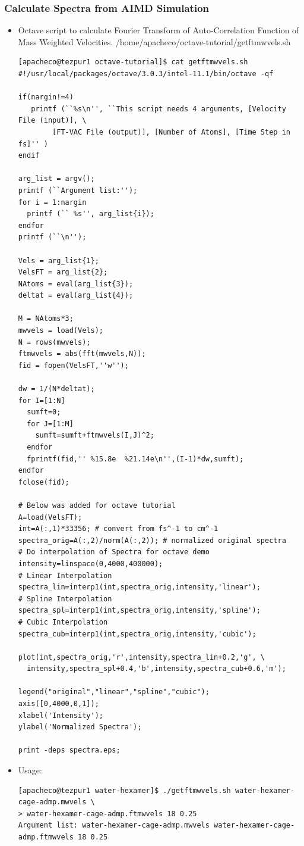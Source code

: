 \documentclass[slidestop,mathserif,compress,xcolor=svgnames]{beamer}
\begin{document}
\begin{frame}
  \frametitle{\small Calculate Spectra from AIMD Simulation}
  \begin{itemize}
    \item Octave script to calculate Fourier Transform of Auto-Correlation Function of Mass Weighted Velocities. /home/apacheco/octave-tutorial/getftmwvels.sh
  {\tiny
    \begin{verbatim}
[apacheco@tezpur1 octave-tutorial]$ cat getftmwvels.sh
#!/usr/local/packages/octave/3.0.3/intel-11.1/bin/octave -qf

if(nargin!=4)
   printf (``%s\n'', ``This script needs 4 arguments, [Velocity File (input)], \
        [FT-VAC File (output)], [Number of Atoms], [Time Step in fs]'' )
endif

arg_list = argv();
printf (``Argument list:'');
for i = 1:nargin
  printf (`` %s'', arg_list{i});
endfor
printf (``\n'');

Vels = arg_list{1};
VelsFT = arg_list{2};
NAtoms = eval(arg_list{3});
deltat = eval(arg_list{4});

M = NAtoms*3;
mwvels = load(Vels);
N = rows(mwvels);
ftmwvels = abs(fft(mwvels,N));
fid = fopen(VelsFT,''w'');

dw = 1/(N*deltat);
for I=[1:N]
  sumft=0;
  for J=[1:M]
    sumft=sumft+ftmwvels(I,J)^2;
  endfor
  fprintf(fid,'' %15.8e  %21.14e\n'',(I-1)*dw,sumft);
endfor
fclose(fid);

# Below was added for octave tutorial
A=load(VelsFT);
int=A(:,1)*33356; # convert from fs^-1 to cm^-1
spectra_orig=A(:,2)/norm(A(:,2)); # normalized original spectra
# Do interpolation of Spectra for octave demo
intensity=linspace(0,4000,400000);
# Linear Interpolation
spectra_lin=interp1(int,spectra_orig,intensity,'linear');
# Spline Interpolation
spectra_spl=interp1(int,spectra_orig,intensity,'spline');
# Cubic Interpolation
spectra_cub=interp1(int,spectra_orig,intensity,'cubic');

plot(int,spectra_orig,'r',intensity,spectra_lin+0.2,'g', \
  intensity,spectra_spl+0.4,'b',intensity,spectra_cub+0.6,'m');

legend("original","linear","spline","cubic");
axis([0,4000,0,1]);
xlabel('Intensity');
ylabel('Normalized Spectra');

print -deps spectra.eps;
    \end{verbatim}
  }
  \item Usage: 
  {\tiny
    \begin{verbatim}
[apacheco@tezpur1 water-hexamer]$ ./getftmwvels.sh water-hexamer-cage-admp.mwvels \
> water-hexamer-cage-admp.ftmwvels 18 0.25
Argument list: water-hexamer-cage-admp.mwvels water-hexamer-cage-admp.ftmwvels 18 0.25


\end{verbatim}}
\end{itemize}
\end{frame}
\end{document}
